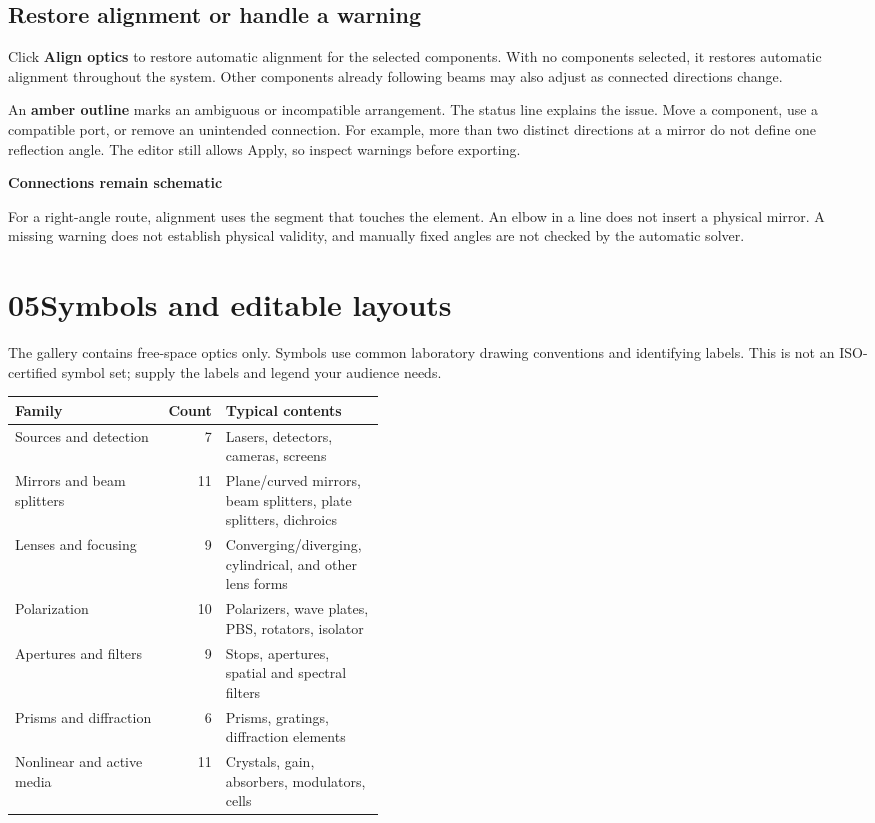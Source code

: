 \documentclass[11pt,a4paper]{article}
\newcommand{\guidepage}[2]{\clearpage\pdfbookmark[0]{#1 - #2}{guide-#1}\section*{\textcolor{accent}{#1}\quad #2}}
\newcommand{\note}[2]{\par\smallskip\noindent\colorbox{pale}{\parbox{\dimexpr\linewidth-18pt\relax}{\vspace{5pt}\textbf{#1}\par\vspace{3pt}#2\vspace{5pt}}}\par\smallskip}
\begin{document}
\subsection*{Restore alignment or handle a warning}
Click \textbf{Align optics} to restore automatic alignment for the selected components. With no components selected, it restores automatic alignment throughout the system. Other components already following beams may also adjust as connected directions change.

An \textbf{amber outline} marks an ambiguous or incompatible arrangement. The status line explains the issue. Move a component, use a compatible port, or remove an unintended connection. For example, more than two distinct directions at a mirror do not define one reflection angle. The editor still allows Apply, so inspect warnings before exporting.

\note{Connections remain schematic}{For a right-angle route, alignment uses the segment that touches the element. An elbow in a line does not insert a physical mirror. A missing warning does not establish physical validity, and manually fixed angles are not checked by the automatic solver.}

\guidepage{05}{Symbols and editable layouts}
The gallery contains free-space optics only. Symbols use common laboratory drawing conventions and identifying labels. This is not an ISO-certified symbol set; supply the labels and legend your audience needs.

\begin{tabularx}{\linewidth}{@{}Yr>{\raggedright\arraybackslash}p{0.43\linewidth}@{}}
\toprule
\textbf{Family} & \textbf{Count} & \textbf{Typical contents} \\
\midrule
Sources and detection & 7 & Lasers, detectors, cameras, screens \\
Mirrors and beam splitters & 11 & Plane/curved mirrors, beam splitters, plate splitters, dichroics \\
Lenses and focusing & 9 & Converging/diverging, cylindrical, and other lens forms \\
Polarization & 10 & Polarizers, wave plates, PBS, rotators, isolator \\
Apertures and filters & 9 & Stops, apertures, spatial and spectral filters \\
Prisms and diffraction & 6 & Prisms, gratings, diffraction elements \\
Nonlinear and active media & 11 & Crystals, gain, absorbers, modulators, cells \\
\bottomrule
\end{tabularx}
\end{document}

